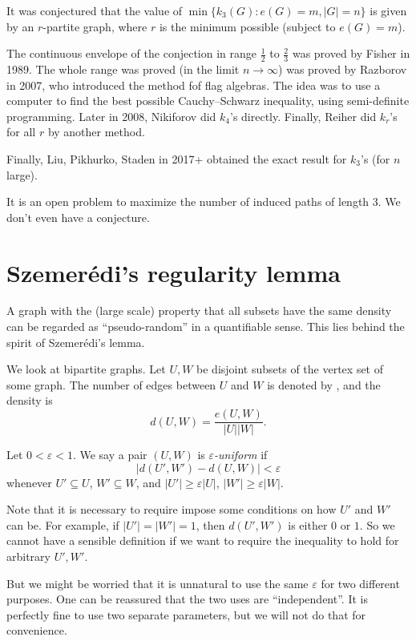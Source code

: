 \documentclass[a4paper]{article}
\begin{document}
It was conjectured that the value of $\min \{k_3(G): e(G) = m, |G| = n\}$ is given by an $r$-partite graph, where $r$ is the minimum possible (subject to $e(G) = m$).

The continuous envelope of the conjection in range $\frac{1}{2}$ to $\frac{2}{3}$ was proved by Fisher in 1989. The whole range was proved (in the limit $n \to \infty$) was proved by Razborov in 2007, who introduced the method fof flag algebras. The idea was to use a computer to find the best possible Cauchy--Schwarz inequality, using semi-definite programming. Later in 2008, Nikiforov did $k_4$'s directly. Finally, Reiher did $k_r$'s for all $r$ by another method.

Finally, Liu, Pikhurko, Staden in 2017+ obtained the exact result for $k_3$'s (for $n$ large).

It is an open problem to maximize the number of induced paths of length $3$. We don't even have a conjecture.

\section{\texorpdfstring{Szemer\'edi's}{Szemeredi's} regularity lemma}
A graph with the (large scale) property that all subsets have the same density can be regarded as ``pseudo-random'' in a quantifiable sense. This lies behind the spirit of Szemer\'edi's lemma.

We look at bipartite graphs. Let $U, W$ be disjoint subsets of the vertex set of some graph. The number of edges between $U$ and $W$ is denoted by , and the density is
\[
  d(U, W) = \frac{e(U, W)}{|U| |W|}.
\]
\begin{defi}
  Let $0 < \varepsilon < 1$. We say a pair $(U, W)$ is \emph{$\varepsilon$-uniform} if
  \[
    |d(U', W') - d(U, W)| < \varepsilon
  \]
  whenever $U' \subseteq U$, $W' \subseteq W$, and $|U'| \geq \varepsilon |U|$, $|W'| \geq \varepsilon |W|$.
\end{defi}

Note that it is necessary to require impose some conditions on how $U'$ and $W'$ can be. For example, if $|U'| = |W'| = 1$, then $d(U', W')$ is either $0$ or $1$. So we cannot have a sensible definition if we want to require the inequality to hold for arbitrary $U', W'$.

But we might be worried that it is unnatural to use the same $\varepsilon$ for two different purposes. One can be reassured that the two uses are ``independent''. It is perfectly fine to use two separate parameters, but we will not do that for convenience.
\end{document}
